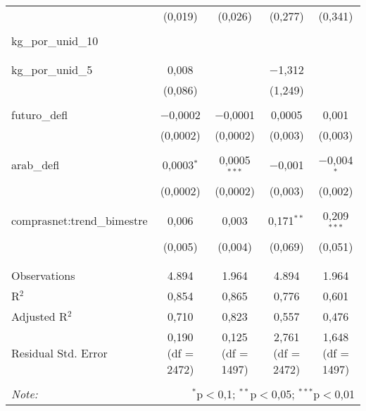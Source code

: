 \begin{table}[!htbp]
\begin{tabular}{@{\extracolsep{5pt}}lcccc}
  & (0,019) & (0,026) & (0,277) & (0,341) \\ 
  & & & & \\ 
 kg\_por\_unid\_10 &  &  &  &  \\ 
  &  &  &  &  \\ 
  & & & & \\ 
 kg\_por\_unid\_5 & 0,008 &  & $-$1,312 &  \\ 
  & (0,086) &  & (1,249) &  \\ 
  & & & & \\ 
 futuro\_defl & $-$0,0002 & $-$0,0001 & 0,0005 & 0,001 \\ 
  & (0,0002) & (0,0002) & (0,003) & (0,003) \\ 
  & & & & \\ 
 arab\_defl & 0,0003$^{*}$ & 0,0005$^{***}$ & $-$0,001 & $-$0,004$^{*}$ \\ 
  & (0,0002) & (0,0002) & (0,003) & (0,002) \\ 
  & & & & \\ 
 comprasnet:trend\_bimestre & 0,006 & 0,003 & 0,171$^{**}$ & 0,209$^{***}$ \\ 
  & (0,005) & (0,004) & (0,069) & (0,051) \\ 
  & & & & \\ 
\hline \\[-1.8ex] 
Observations & 4.894 & 1.964 & 4.894 & 1.964 \\ 
R$^{2}$ & 0,854 & 0,865 & 0,776 & 0,601 \\ 
Adjusted R$^{2}$ & 0,710 & 0,823 & 0,557 & 0,476 \\ 
Residual Std. Error & 0,190 (df = 2472) & 0,125 (df = 1497) & 2,761 (df = 2472) & 1,648 (df = 1497) \\ 
\hline 
\hline \\[-1.8ex] 
\textit{Note:}  & \multicolumn{4}{r}{$^{*}$p$<$0,1; $^{**}$p$<$0,05; $^{***}$p$<$0,01} \\ 
\end{tabular} 
\end{table} 
